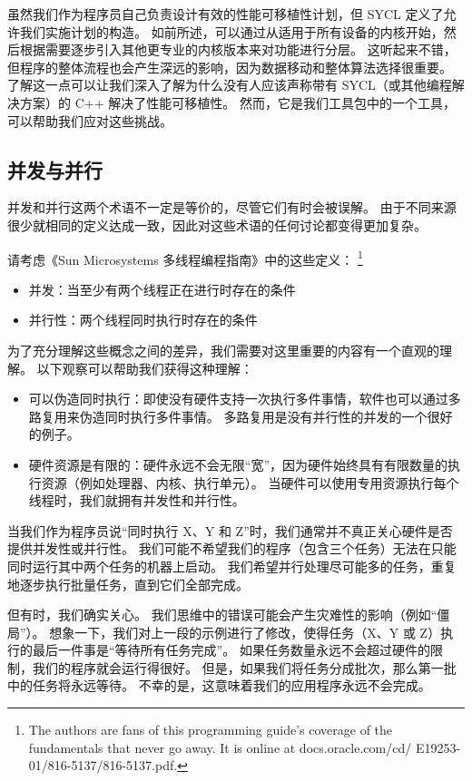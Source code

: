 虽然我们作为程序员自己负责设计有效的性能可移植性计划，但 SYCL 定义了允许我们实施计划的构造。 
如前所述，可以通过从适用于所有设备的内核开始，然后根据需要逐步引入其他更专业的内核版本来对功能进行分层。 
这听起来不错，但程序的整体流程也会产生深远的影响，因为数据移动和整体算法选择很重要。 
了解这一点可以让我们深入了解为什么没有人应该声称带有 SYCL（或其他编程解决方案）的 C++ 解决了性能可移植性。 
然而，它是我们工具包中的一个工具，可以帮助我们应对这些挑战。


\subsection{并发与并行}
并发和并行这两个术语不一定是等价的，尽管它们有时会被误解。 
由于不同来源很少就相同的定义达成一致，因此对这些术语的任何讨论都变得更加复杂。

请考虑《Sun Microsystems 多线程编程指南》中的这些定义：
\footnote{The authors are fans of this programming guide’s coverage of the fundamentals that never go away. It is online at docs.oracle.com/cd/ E19253-01/816-5137/816-5137.pdf.}

\begin{itemize}
	\item 并发：当至少有两个线程正在进行时存在的条件

	\item 并行性：两个线程同时执行时存在的条件
\end{itemize}

为了充分理解这些概念之间的差异，我们需要对这里重要的内容有一个直观的理解。 
以下观察可以帮助我们获得这种理解：

\begin{itemize}
	\item 可以伪造同时执行：即使没有硬件支持一次执行多件事情，软件也可以通过多路复用来伪造同时执行多件事情。 
		多路复用是没有并行性的并发的一个很好的例子。

	\item 硬件资源是有限的：硬件永远不会无限“宽”，因为硬件始终具有有限数量的执行资源（例如处理器、内核、执行单元）。 
	当硬件可以使用专用资源执行每个线程时，我们就拥有并发性和并行性。
\end{itemize}

当我们作为程序员说“同时执行 X、Y 和 Z”时，我们通常并不真正关心硬件是否提供并发性或并行性。 
我们可能不希望我们的程序（包含三个任务）无法在只能同时运行其中两个任务的机器上启动。 
我们希望并行处理尽可能多的任务，重复地逐步执行批量任务，直到它们全部完成。

但有时，我们确实关心。 我们思维中的错误可能会产生灾难性的影响（例如“僵局”）。 
想象一下，我们对上一段的示例进行了修改，使得任务（X、Y 或 Z）执行的最后一件事是“等待所有任务完成”。 
如果任务数量永远不会超过硬件的限制，我们的程序就会运行得很好。 
但是，如果我们将任务分成批次，那么第一批中的任务将永远等待。 不幸的是，这意味着我们的应用程序永远不会完成。

